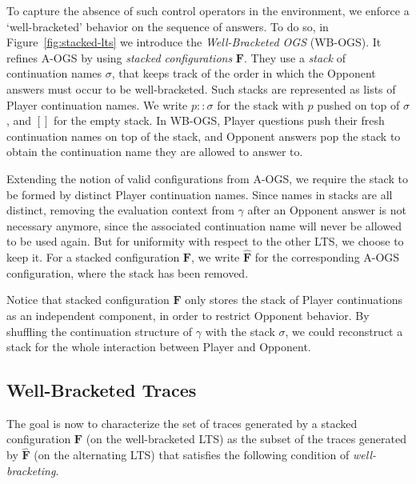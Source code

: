 \documentclass[11pt,a4paper]{amsart}
\theoremstyle{plain}
\theoremstyle{definition}
\theoremstyle{defC}
\theoremstyle{thmC}
\theoremstyle{plain}
\numberwithin{equation}{section}
\newcommand{\wrt}{with respect to\xspace}  %
\newcommand{\stt}{\sigma}
\newcommand{\AOGS}{\mbox{{\rm A-OGS}}\xspace}      %
\newcommand{\WBOGS}{\mbox{{\rm WB-OGS}}\xspace}      %
\newcommand{\FF}{F}
\newcommand{\FFb}{{\bm{\FF}}} %
\newcommand{\es}{\eraseStack}
\newcommand{\eraseStack}[1]{\widehat{#1}}
\newcommand{\emptystack}{[]}
\theoremstyle{plain}
\theoremstyle{definition}
\begin{document}
To capture the absence of such control operators in the environment,
we enforce a `well-bracketed' behavior on the sequence of answers.
To do so, in Figure~\ref{fig:stacked-lts} we introduce the  \emph{Well-Bracketed OGS} (\WBOGS).  
It refines \AOGS by using \emph{stacked configurations} $\FFb$.
They use a \emph{stack} of continuation names $\stt$, that keeps track
of the order in which the Opponent answers must occur to be well-bracketed.
Such stacks
are represented as lists of Player continuation names.
We write $p:: \stt$ for the stack with $p$ pushed on top of $\stt$, 
and $\emptystack$ for the empty stack.
In \WBOGS, Player questions push their fresh continuation names on top of the stack, and
Opponent answers pop the stack to obtain the continuation name they are allowed to answer to.

Extending the notion of valid configurations from \AOGS,
we require the stack to be formed by distinct Player continuation names.
Since names in stacks are all distinct, removing the evaluation context 
from $\gamma$ after an Opponent answer is not necessary anymore, since the 
associated continuation name will never be allowed to be used again. 
But for uniformity \wrt the other LTS, we choose to keep it.
For a stacked configuration $\FFb$, we write $\es \FFb$ for the corresponding \AOGS
configuration, where the stack has been removed.

Notice that stacked configuration $\FFb$
only stores the stack of Player continuations as an independent component,
in order to restrict Opponent behavior.
By shuffling the continuation structure of $\gamma$ with
the stack $\sigma$, we could reconstruct
a stack for the whole interaction between Player and Opponent.

\subsection{Well-Bracketed Traces}

The goal is now to characterize the set of traces generated by a stacked configuration
$\FFb$ (on the well-bracketed LTS) as the subset of the traces generated by $\es \FFb$ 
(on the alternating LTS) that satisfies the following condition of \emph{well-bracketing}.
\end{document}

